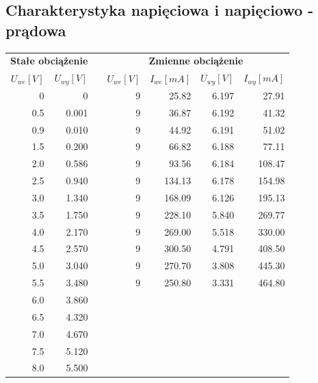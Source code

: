 \documentclass[a4paper,12pt]{article}
\begin{document}
\subsection{Charakterystyka napięciowa i napięciowo - prądowa}
\begin{table}[ht]
  \centering
  \begin{tabular}{|r|r|r|r|r|r|r|}
    \hline
    \multicolumn{2}{|c|}{\textbf{Stałe obciążenie}} &  & \multicolumn{4}{c|}{\textbf{Zmienne obciążenie}} \\ \cline{1-2} \cline{4-7}
    \textbf{$U_{we}[V]$} & \textbf{$U_{wy}[V]$} & & \textbf{$U_{we}[V]$} & \textbf{$I_{we}[mA]$} & \textbf{$U_{wy}[V]$} & \textbf{$I_{wy}[mA]$} \\ \cline{1-2} \cline{4-7}
    0		& 0	&	& 9	& 25.82		& 6.197		& 27.91 \\ \cline{1-2} \cline{4-7}
    0.5		& 0.001 &	& 9 	& 36.87		& 6.192		& 41.32 \\ \cline{1-2} \cline{4-7}
    0.9		& 0.010	&	& 9	& 44.92		& 6.191		& 51.02	\\ \cline{1-2} \cline{4-7}
    1.5		& 0.200	&	& 9 	& 66.82		& 6.188		& 77.11 \\ \cline{1-2} \cline{4-7}
    2.0		& 0.586	&	& 9	& 93.56		& 6.184		& 108.47 \\ \cline{1-2} \cline{4-7}
    2.5		& 0.940 &	& 9	& 134.13	& 6.178		& 154.98 \\ \cline{1-2} \cline{4-7}
    3.0		& 1.340 &	& 9	& 168.09	& 6.126		& 195.13 \\ \cline{1-2} \cline{4-7}
    3.5		& 1.750 &	& 9	& 228.10	& 5.840		& 269.77 \\ \cline{1-2} \cline{4-7}
    4.0		& 2.170	&	& 9	& 269.00	& 5.518		& 330.00 \\ \cline{1-2} \cline{4-7}
    4.5		& 2.570	&	& 9	& 300.50	& 4.791		& 408.50 \\ \cline{1-2} \cline{4-7}
    5.0		& 3.040 &	& 9	& 270.70	& 3.808		& 445.30 \\ \cline{1-2} \cline{4-7}
    5.5		& 3.480 &	& 9	& 250.80	& 3.331		& 464.80 \\ \cline{1-2} \cline{4-7}
    6.0		& 3.860	&	& \multicolumn{4}{c|}{} \\ \cline{1-2} 
    6.5		& 4.320	&	& \multicolumn{4}{c|}{} \\ \cline{1-2} 
    7.0		& 4.670	&	& \multicolumn{4}{c|}{} \\ \cline{1-2} 
    7.5		& 5.120 &	& \multicolumn{4}{c|}{} \\ \cline{1-2} 
    8.0		& 5.500	&	& \multicolumn{4}{c|}{} \\ \cline{1-2} 

\end{tabular}
\end{table}
\end{document}
